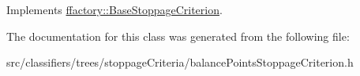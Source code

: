 Implements \hyperlink{classffactory_1_1_base_stoppage_criterion_a47728f0c9b241133e228ea5956248241}{ffactory\-::\-Base\-Stoppage\-Criterion}.



The documentation for this class was generated from the following file\-:\begin{DoxyCompactItemize}
\item 
src/classifiers/trees/stoppage\-Criteria/balance\-Points\-Stoppage\-Criterion.\-h\end{DoxyCompactItemize}
